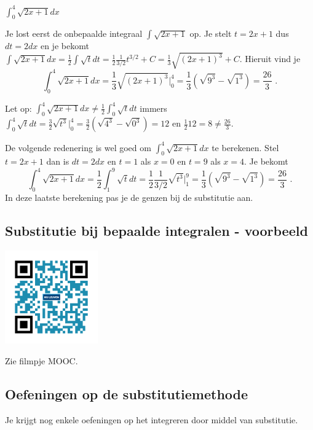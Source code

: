 \begin{voorbeeld}
	$\int ^4_0 \sqrt{2x+1}dx$

Je lost eerst de onbepaalde integraal $\int \sqrt{2x+1}$ op.
Je stelt $t=2x+1$ dus $dt=2dx$ en je bekomt $\int \sqrt {2x+1} dx=\frac{1}{2} \int \sqrt {t} dt=\frac {1}{2} \frac{1}{3/2} t^{3/2}+C=\frac{1}{3} \sqrt {(2x+1)^3}+C$.
Hieruit vind je
\[
\int ^4_0 \sqrt {2x+1} dx=\frac{1}{3} \sqrt {(2x+1)^3}\vert ^4_0=\frac{1}{3}\left( \sqrt{9^3} - \sqrt{1^3} \right)=\frac{26}{3} \text { .}
\]

Let op: $\int ^4_0 \sqrt {2x+1}dx \neq \frac{1}{2} \int ^4_0 \sqrt {t} dt$ immers $\int ^4_0 \sqrt {t} dt=\frac{3}{2}\sqrt {t^3}\vert ^4_0=\frac{3}{2}\left( \sqrt {4^3}-\sqrt {0^3} \right)=12$ en $\frac{1}{2}12=8\neq \frac{26}{3}$.

De volgende redenering is wel goed om $\int ^4_0 \sqrt {2x+1}dx$ te berekenen.
Stel $t=2x+1$ dan is $dt=2dx$ en $t=1$ als $x=0$ en $t=9$ als $x=4$.
Je bekomt
\[
\int ^4_0 \sqrt{2x+1}dx = \frac{1}{2} \int ^9_1 \sqrt {t} dt= \frac{1}{2} \frac{1}{3/2} \sqrt {t^3} \vert^9_1=\frac{1}{3} \left( \sqrt{9^3}-\sqrt{1^3} \right)=\frac{26}{3} \text { .}
\]
In deze laatste berekening pas je de genzen bij de substitutie aan.

\end{voorbeeld}

\subsection{Substitutie bij bepaalde integralen - voorbeeld}
\begin{minipage}{.25\linewidth}
	\raggedright
	\includegraphics[width=4cm]{6_afgeleiden_integralen/inputs/QR_Code_SUBSTBEPVB_module6_3}
\end{minipage}
\begin{minipage}{.7\linewidth}
	Zie filmpje MOOC.
\end{minipage}


\subsection{Oefeningen op de substitutiemethode}
Je krijgt nog enkele oefeningen op het integreren door middel van substitutie.


